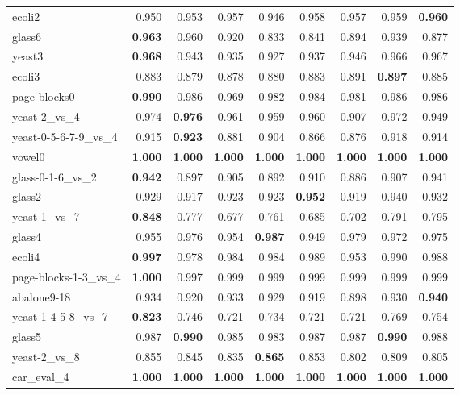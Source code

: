 \begin{table}[!htbp]
{\begin{tabular}{lrrrrrrrr}
			ecoli2 & 0.950 & 0.953 & 0.957 & 0.946 & 0.958 & 0.957 & 0.959 & \textbf{0.960} \\
			glass6 & \textbf{0.963} & 0.960 & 0.920 & 0.833 & 0.841 & 0.894 & 0.939 & 0.877 \\
			yeast3 & \textbf{0.968} & 0.943 & 0.935 & 0.927 & 0.937 & 0.946 & 0.966 & 0.967 \\
			ecoli3 & 0.883 & 0.879 & 0.878 & 0.880 & 0.883 & 0.891 & \textbf{0.897} & 0.885 \\
			page-blocks0 & \textbf{0.990} & 0.986 & 0.969 & 0.982 & 0.984 & 0.981 & 0.986 & 0.986 \\
			yeast-2\_vs\_4 & 0.974 & \textbf{0.976} & 0.961 & 0.959 & 0.960 & 0.907 & 0.972 & 0.949 \\
			yeast-0-5-6-7-9\_vs\_4 & 0.915 & \textbf{0.923} & 0.881 & 0.904 & 0.866 & 0.876 & 0.918 & 0.914 \\
			vowel0 & \textbf{1.000} & \textbf{1.000} & \textbf{1.000} & \textbf{1.000} & \textbf{1.000} & \textbf{1.000} & \textbf{1.000} & \textbf{1.000} \\
			glass-0-1-6\_vs\_2 & \textbf{0.942} & 0.897 & 0.905 & 0.892 & 0.910 & 0.886 & 0.907 & 0.941 \\
			glass2 & 0.929 & 0.917 & 0.923 & 0.923 & \textbf{0.952} & 0.919 & 0.940 & 0.932 \\
			yeast-1\_vs\_7 & \textbf{0.848} & 0.777 & 0.677 & 0.761 & 0.685 & 0.702 & 0.791 & 0.795 \\
			glass4 & 0.955 & 0.976 & 0.954 & \textbf{0.987} & 0.949 & 0.979 & 0.972 & 0.975 \\
			ecoli4 & \textbf{0.997} & 0.978 & 0.984 & 0.984 & 0.989 & 0.953 & 0.990 & 0.988 \\
			page-blocks-1-3\_vs\_4 & \textbf{1.000} & 0.997 & 0.999 & 0.999 & 0.999 & 0.999 & 0.999 & 0.999 \\
			abalone9-18 & 0.934 & 0.920 & 0.933 & 0.929 & 0.919 & 0.898 & 0.930 & \textbf{0.940} \\
			yeast-1-4-5-8\_vs\_7 & \textbf{0.823} & 0.746 & 0.721 & 0.734 & 0.721 & 0.721 & 0.769 & 0.754 \\
			glass5 & 0.987 & \textbf{0.990} & 0.985 & 0.983 & 0.987 & 0.987 & \textbf{0.990} & 0.988 \\
			yeast-2\_vs\_8 & 0.855 & 0.845 & 0.835 & \textbf{0.865} & 0.853 & 0.802 & 0.809 & 0.805 \\
			car\_eval\_4 & \textbf{1.000} & \textbf{1.000} & \textbf{1.000} & \textbf{1.000} & \textbf{1.000} & \textbf{1.000} & \textbf{1.000} & \textbf{1.000} \\

\end{tabular}}
\end{table}

